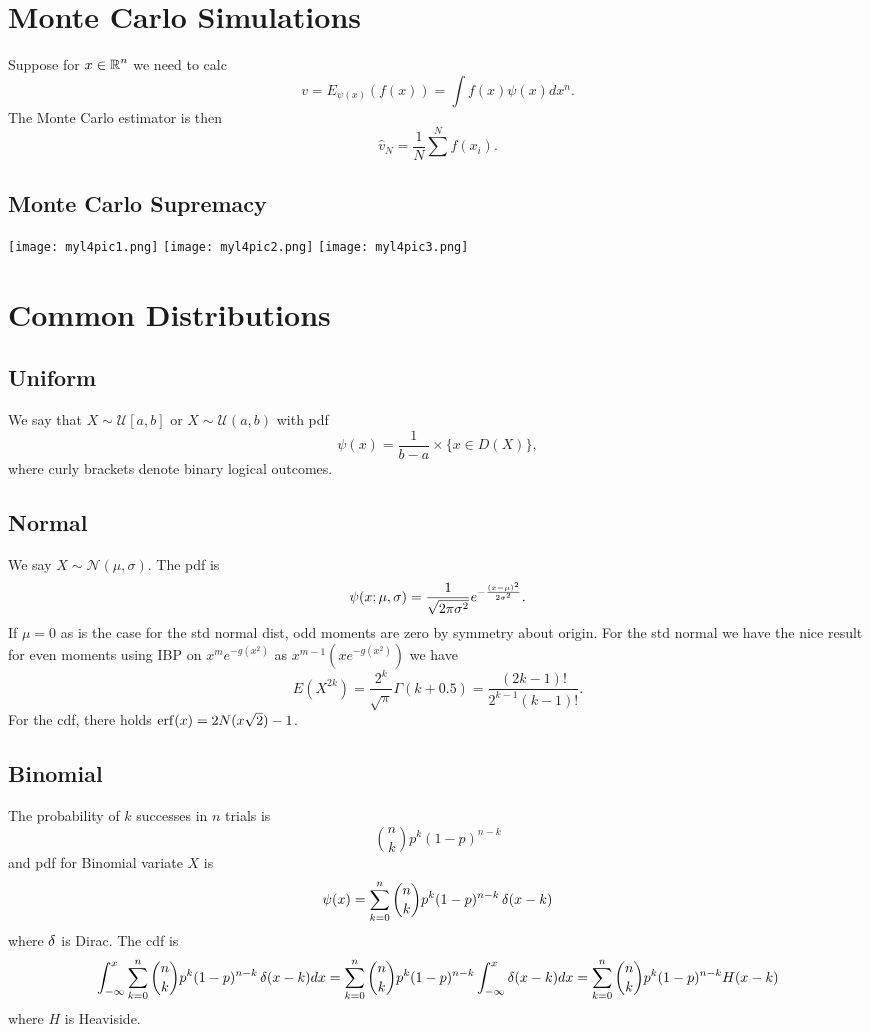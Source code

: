 \section{Monte Carlo Simulations}
Suppose for $x \in \operatorname{\mathbb{R}}^n$ we need to calc $$
v = E_{\psi(x)}(f(x)) = \int f(x) \psi(x)dx^n.
$$
The Monte Carlo estimator is then $$
\hat{v}_N = \frac{1}{N} \sum^N f(x_i).
$$
\subsection{Monte Carlo Supremacy}
\begin{center}
\texttt{[image: myl4pic1.png]}
\texttt{[image: myl4pic2.png]}
\texttt{[image: myl4pic3.png]}
\end{center}
\section{Common Distributions}
\subsection{Uniform}
We say that $X \sim \mathcal{U}[a,b]$ or $X \sim \mathcal{U}(a,b)$ with pdf $$
\psi(x) = \frac{1}{b-a} \times \{x \in D(X)\},
$$
where curly brackets denote binary logical outcomes.
\subsection{Normal}
We say $X \sim \mathcal{N}(\mu,\sigma)$. The pdf is $$
\psi(x; \mu,\sigma) = \frac{1}{\sqrt{2\pi\sigma^2}} e^{-\frac{\left(x-\mu\right)^2}{2\sigma^2}}.
$$
If $\mu = 0$ as is the case for the std normal dist, odd moments are zero by symmetry about origin.
For the std normal we have the nice result for even moments using IBP on $x^m e^{-g(x^2)}$ as $x^{m-1}(xe^{-g(x^2)})$ we have
$$
E(X^{2k}) = \frac{2^k}{\sqrt{\pi}} \Gamma(k+0.5) = \frac{(2k-1)!}{2^{k-1}(k-1)!}.
$$
For the cdf, there holds $\operatorname{erf}(x) = 2N(x\sqrt{2})-1$.
\subsection{Binomial}
The probability of $k$ successes in $n$ trials is
$$
{n \choose k}p^k(1-p)^{n-k}
$$
and pdf for Binomial variate $X$ is $$
\psi(x) = \sum_{k=0}^n {n \choose k} p^k(1-p)^{n-k}\operatorname{\delta}(x-k)
$$
where $\operatorname{\delta}$ is Dirac. The cdf is
$$
\int_{-\infty}^x \sum_{k=0}^n {n \choose k} p^k(1-p)^{n-k}\operatorname{\delta}(x-k)dx =  \sum_{k=0}^n {n \choose k} p^k(1-p)^{n-k} \int_{-\infty}^x \operatorname{\delta}(x-k)dx =  \sum_{k=0}^n {n \choose k} p^k(1-p)^{n-k}H(x-k)
$$
where $H$ is Heaviside.
